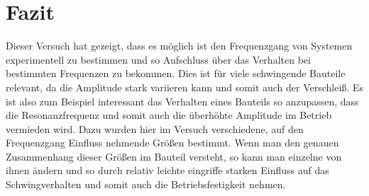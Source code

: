 \documentclass[a4paper,12pt]{scrartcl}
\begin{document}
\section{Fazit}
Dieser Versuch hat gezeigt, dass es möglich ist den Frequenzgang von Systemen experimentell zu bestimmen und so Aufschluss über das Verhalten
bei bestimmten Frequenzen zu bekommen. Dies ist für viele schwingende Bauteile relevant, da die Amplitude stark variieren kann und somit auch
der Verschleiß. Es ist also zum Beispiel interessant das Verhalten eines Bauteils so anzupassen, dass die Resonanzfrequenz und somit auch die
überhöhte Amplitude im Betrieb vermieden wird. Dazu wurden hier im Versuch verschiedene, auf den Frequenzgang Einfluss nehmende Größen bestimmt.
Wenn man den genauen Zusammenhang dieser Größen im Bauteil versteht, so kann man einzelne von ihnen ändern und so durch relativ leichte eingriffe
starken Einfluss auf das Schwingverhalten und somit auch die Betriebsfestigkeit nehmen.


\pagebreak
\nocite{*}
\sloppy %
\printbibliography
\end{document}
